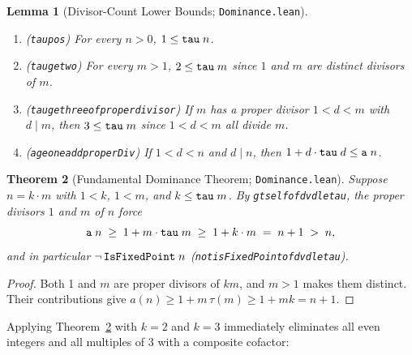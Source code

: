 \documentclass[11pt,reqno]{amsart}
\theoremstyle{plain}
\newtheorem{theorem}{Theorem}[section]
\newtheorem{lemma}[theorem]{Lemma}
\theoremstyle{definition}
\theoremstyle{remark}
\newcommand{\leanid}[1]{\texttt{\upshape\def\_{\char95\relax}#1}}
\begin{document}
\begin{lemma}[Divisor-Count Lower Bounds; \leanid{Dominance.lean}]
\label{lem:tau_bounds}
\leavevmode
\begin{enumerate}
  \item (\leanid{tau\_\allowbreak pos}) For every $n > 0$, $1 \le \leanid{tau}\;n$.
  \item (\leanid{tau\_\allowbreak ge\_\allowbreak two}) For every $m > 1$, $2 \le \leanid{tau}\;m$ since $1$ and $m$ are distinct divisors of $m$.
  \item (\leanid{tau\_\allowbreak ge\_\allowbreak three\_\allowbreak of\_\allowbreak proper\_\allowbreak divisor}) If $m$ has a proper divisor $1 < d < m$ with $d \mid m$, then $3 \le \leanid{tau}\;m$ since $1 < d < m$ all divide $m$.
  \item (\leanid{a\_\allowbreak ge\_\allowbreak one\_\allowbreak add\_\allowbreak properDiv}) If $1 < d < n$ and $d \mid n$, then $1 + d \cdot \leanid{tau}\;d \le \leanid{a}\;n$.
\end{enumerate}
\end{lemma}

\begin{theorem}[Fundamental Dominance Theorem; \leanid{Dominance.lean}]
\label{thm:dominance}
Suppose $n = k \cdot m$ with $1 < k$, $1 < m$, and $k \le \leanid{tau}\;m$. By \leanid{gt\_\allowbreak self\_\allowbreak of\_\allowbreak dvd\_\allowbreak le\_\allowbreak tau}, the proper divisors $1$ and $m$ of $n$ force
\[
  \leanid{a}\;n \;\ge\; 1 + m \cdot \leanid{tau}\;m \;\ge\; 1 + k \cdot m \;=\; n + 1 \;>\; n,
\]
and in particular $\neg\,\leanid{IsFixedPoint}\;n$ (\leanid{not\_\allowbreak isFixedPoint\_\allowbreak of\_\allowbreak dvd\_\allowbreak le\_\allowbreak tau}).
\end{theorem}

\begin{proof}
Both 1 and $m$ are proper divisors of $km$, and $m>1$ makes them distinct. Their contributions give $a(n)\ge1+m\,\tau(m)\ge1+mk=n+1$.
\end{proof}

Applying Theorem~\ref{thm:dominance} with $k = 2$ and $k = 3$ immediately eliminates all even integers and all multiples of $3$ with a composite cofactor:
\end{document}
